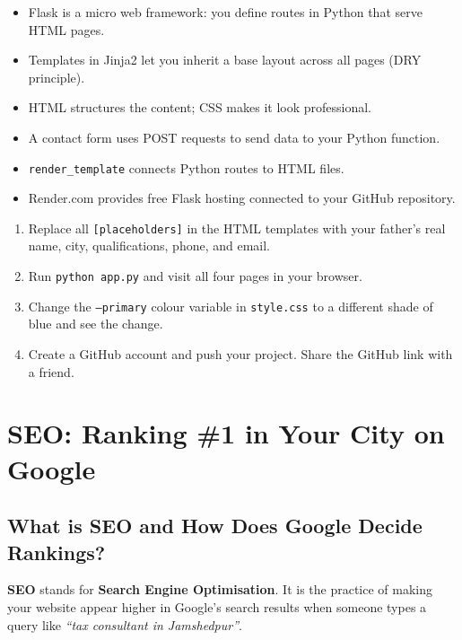 \documentclass[12pt, a4paper]{book}
\begin{document}
\begin{tcolorbox}[learnedbox]
\begin{itemize}
  \item Flask is a micro web framework: you define routes in Python that serve HTML pages.
  \item Templates in Jinja2 let you inherit a base layout across all pages (DRY principle).
  \item HTML structures the content; CSS makes it look professional.
  \item A contact form uses POST requests to send data to your Python function.
  \item \texttt{render\_template} connects Python routes to HTML files.
  \item Render.com provides free Flask hosting connected to your GitHub repository.
\end{itemize}
\end{tcolorbox}

\begin{tcolorbox}[taskbox]
\begin{enumerate}
  \item Replace all \texttt{[placeholders]} in the HTML templates with your father's real name, city, qualifications, phone, and email.
  \item Run \texttt{python app.py} and visit all four pages in your browser.
  \item Change the \texttt{--primary} colour variable in \texttt{style.css} to a different shade of blue and see the change.
  \item Create a GitHub account and push your project. Share the GitHub link with a friend.
\end{enumerate}
\end{tcolorbox}


\chapter{SEO: Ranking \#1 in Your City on Google}

\section{What is SEO and How Does Google Decide Rankings?}

\textbf{SEO} stands for \textbf{Search Engine Optimisation}.
It is the practice of making your website appear higher in Google's search results
when someone types a query like \emph{``tax consultant in Jamshedpur''}.
\end{document}
